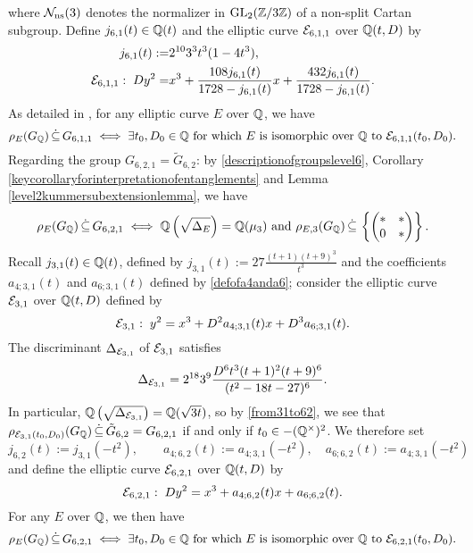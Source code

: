 where $\mathcal{N}_{\operatorname{ns}}(3)$ denotes the normalizer in $\operatorname{GL}_2(\mathbb{Z}/3\mathbb{Z})$ of a non-split Cartan subgroup. Define $j_{6,1}(t) \in \mathbb{Q}(t)$ and the elliptic curve $\mathcal{E}_{6,1,1}$ over $\mathbb{Q}(t,D)$ by
\[
\begin{split}
j_{6,1}(t) :=& 2^{10}3^3t^3(1-4t^3), \\
\mathcal{E}_{6,1,1} : \; Dy^2 =& x^3 + \frac{108 j_{6,1}(t)}{1728 - j_{6,1}(t)} x + \frac{432 j_{6,1}(t)}{1728 - j_{6,1}(t)}.
\end{split}
\]
As detailed in \cite{braujones}, for any elliptic curve $E$ over $\mathbb{Q}$, we have
\begin{equation*} %
\rho_{E}(G_\mbq) \, \dot\subseteq \, G_{6,1,1} \; \Longleftrightarrow \; \exists t_0, D_0 \in \mbq \text{ for which } E \text{ is isomorphic over $\mbq$ to } \mc{E}_{6,1,1}(t_0,D_0).
\end{equation*}
Regarding the group $G_{6,2,1} = \tilde{G}_{6,2}$: by \eqref{descriptionofgroupslevel6}, Corollary \ref{keycorollaryforinterpretationofentanglements} and Lemma \ref{level2kummersubextensionlemma}, we have
\begin{equation} \label{from31to62}
\rho_{E}(G_{\mathbb{Q}}) \, \dot\subseteq \, G_{6,2,1} \; \Longleftrightarrow \; \mathbb{Q}\left( \sqrt{\Delta_E} \right) = \mathbb{Q}(\mu_3) \text{ and } \rho_{E,3}(G_{\mathbb{Q}}) \, \dot\subseteq \, \left\{ \begin{pmatrix} * & * \\ 0 & * \end{pmatrix} \right\}.
\end{equation}
Recall $j_{3,1}(t) \in \mathbb{Q}(t)$, defined by $j_{3,1}(t) := 27\frac{(t+1)(t+9)^3}{t^3}$ and the coefficients $a_{4;3,1}(t)$ and $a_{6;3,1}(t)$ defined by \eqref{defofa4anda6}; consider the elliptic curve $\mathcal{E}_{3,1}$ over $\mathbb{Q}(t,D)$ defined by 
\[
\mathcal{E}_{3,1} : \; y^2 = x^3 + D^2a_{4;3,1}(t) x + D^3a_{6;3,1}(t).
\]
The discriminant $\Delta_{\mathcal{E}_{3,1}}$ of $\mathcal{E}_{3,1}$ satisfies
\begin{equation} \label{discriminantofmcEsub31}
\Delta_{\mathcal{E}_{3,1}} = 2^{18}3^9\frac{D^6t^3(t+1)^2(t+9)^6}{(t^2-18t-27)^6}.
\end{equation}
In particular, $\mathbb{Q}\left( \sqrt{\Delta_{\mathcal{E}_{3,1}}} \right) = \mathbb{Q}(\sqrt{3t})$, so by \eqref{from31to62}, we see that $\rho_{\mathcal{E}_{3,1}(t_0,D_0)}(G_{\mathbb{Q}}) \, \dot\subseteq \, \tilde{G}_{6,2} = G_{6,2,1}$ if and only if $t_0 \in - (\mathbb{Q}^\times)^2$. We therefore set 
\[
j_{6,2}(t) := j_{3,1}(-t^2), \quad\quad a_{4;6,2}(t) := a_{4;3,1}(-t^2), \quad a_{6;6,2}(t) := a_{4;3,1}(-t^2)
\]
and define the elliptic curve $\mathcal{E}_{6,2,1}$ over $\mathbb{Q}(t,D)$ by
\[
\mathcal{E}_{6,2,1} : \; D y^2 = x^3 + a_{4;6,2}(t) x + a_{6;6,2}(t).
\]
For any $E$ over $\mathbb{Q}$, we then have
\[
\rho_{E}(G_{\mathbb{Q}}) \, \dot\subseteq \, G_{6,2,1} \; \Longleftrightarrow \; \exists t_0, D_0 \in \mathbb{Q} \text{ for which $E$ is isomorphic over $\mathbb{Q}$ to } \mathcal{E}_{6,2,1}(t_0,D_0).
\]

